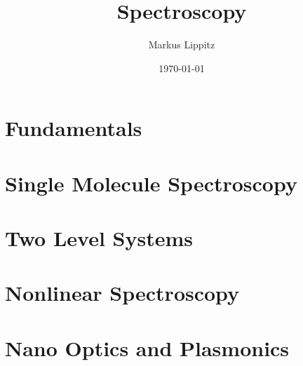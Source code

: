 \documentclass[notoc,nofonts,a4paper,oneside,nobib]{tufte-book}
\begin{document}




\title{Spectroscopy}

\author{Markus Lippitz}
\date{\today}



\maketitle

%
%

\tableofcontents

\part{Fundamentals}





















\part{Single Molecule Spectroscopy}















\part{Two Level Systems}






\part{Nonlinear Spectroscopy}






\part{Nano Optics and Plasmonics}




\nocite{*}

\printbibliography
\end{document}
